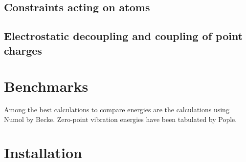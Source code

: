 \documentclass[final,12pt]{article}
\begin{document}
{%
\subsection{Constraints acting on atoms}


\subsection{Electrostatic decoupling and coupling of point charges}


}{} %

\newpage
\section{Benchmarks}
Among the best calculations to compare energies are the calculations
using Numol by Becke\cite{Beckethermochemistry,DFTBenchmarks}.
Zero-point vibration energies have been tabulated by
Pople\cite{Pople}.


\newpage
\section{Installation}
%
\end{document}
